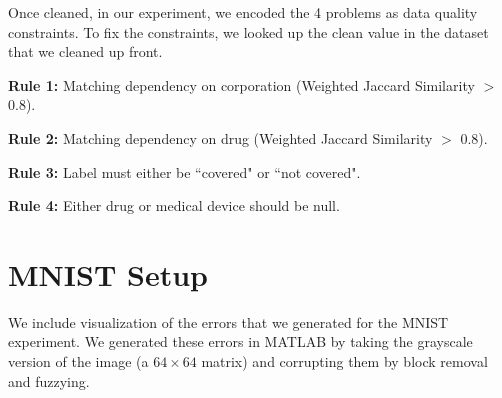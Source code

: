 Once cleaned, in our experiment, we encoded the 4 problems as data quality constraints.
To fix the constraints, we looked up the clean value in the dataset that we cleaned up front.

\vspace{0.25em}

\noindent \textbf{Rule 1: } Matching dependency on corporation (Weighted Jaccard Similarity $>$ 0.8).

\vspace{0.25em}

\noindent \textbf{Rule 2: } Matching dependency on drug (Weighted Jaccard Similarity $>$ 0.8).

\vspace{0.25em}

\noindent \textbf{Rule 3: } Label must either be ``covered" or ``not covered".

\vspace{0.25em} 

\noindent \textbf{Rule 4: } Either drug or medical device should be null.

\vspace{0.5em}

\section{MNIST Setup}
We include visualization of the errors that we generated for the MNIST experiment.
We generated these errors in MATLAB by taking the grayscale version of the image (a $64\times 64$ matrix) and corrupting them by block removal and fuzzying.

